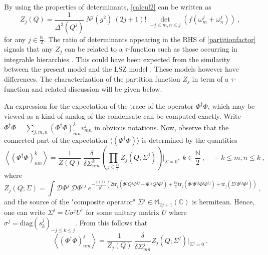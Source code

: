 \documentclass[a4paper,11pt,twoside]{article}
\numberwithin{equation}{section}
\theoremstyle{nonumberplain}
\newcounter{and}
\begin{document}
%
By using the properties of determinants, \eqref{calcul2} can be written as%
%
\begin{equation}
Z_j(Q) = \frac{1}{\Delta^2(Q^j)} \ N^j(g^2) \ (2j+1)! \ \det_{-j\le m,n\le j} \left(f(\omega^j_m+\omega^j_n)\right) \ , \label{partitionfactor}
\end{equation}
%
for any $j\in\frac{\mathbb{N}}{2}$. The ratio of determinants appearing in the RHS of \eqref{partitionfactor} signals that any $Z_j$ can be related to a $\tau$-function such as those occurring in integrable hierarchies \cite{integ1-rev}. This could have been expected from the similarity between the present model and the LSZ model \cite{LSZ}. These models however have differences. The characterization of the partition function $Z_j$ in term of a $\tau$-function and related discussion will be given below.\par%
%
An expression for the expectation of the trace of the operator $\Phi^\dag\Phi$, which may be viewed as a kind of analog of the condensate can be computed exactly. Write $\Phi^\dag\Phi=\sum_{j,m,n}(\Phi^\dag\Phi)^j_{mn}v^j_{mn}$ in obvious notations. Now, observe that the connected part of the expectation $\langle(\Phi^\dag\Phi) \rangle$ is determined by the quantities%
%
\begin{equation}
\left\langle(\Phi^\dag\Phi)^k_{nm}\right\rangle = \frac{1}{Z(Q)} \ \frac{\delta}{\delta\Sigma^k_{nm}} \left(\prod_{j\in\frac{\mathbb{N}}{2}}Z_j(Q;\Sigma^j)\right)\Bigg|_{\Sigma=0 },\ k\in\frac{\mathbb{N}}{2} \ , \quad -k\le m,n\le k \ ,
\end{equation}
%
where%
%
\begin{equation}
Z_j(Q;\Sigma) = \int{\mathcal{D}} \Phi^j \ \mathcal{D} \Phi^{\dag j} \ e^{-\frac{w(j)}{g^2} \left(2\mbox{tr}_j\left(\Phi^j Q^j\Phi^{\dag j}+\Phi^{\dag j} Q^j\Phi^j\right)+\frac{64}{3}\mbox{tr}_j\left(\Phi^j\Phi^{\dag j}\Phi^j\Phi^{\dag j}\right)+\mbox{tr}_j\left(\Sigma^j\Phi^{\dag j}\Phi^j\right) \right)} \ , \label{condensat-generating}
\end{equation}
%
and the source of the "composite operator" $\Sigma^j\in\mathbb{M}_{2j+1}(\mathbb{C})$ is hermitean. Hence, one can write $\Sigma^j=U\sigma^jU^\dag$ for some unitary matrix $U$ where $\sigma^j=\text{diag}(s^j_k)_{-j\le k\le j}$. From this follows that
%
\begin{equation}
\left\langle (\Phi^\dag\Phi)^j_{nm} \right\rangle = \frac{1}{Z_j(Q)} \ \frac{\delta}{\delta\Sigma^j_{mn}} Z_j(Q;\Sigma^j)\bigg|_{\Sigma^j=0} \ . \label{condensat-component}
\end{equation}
\end{document}
